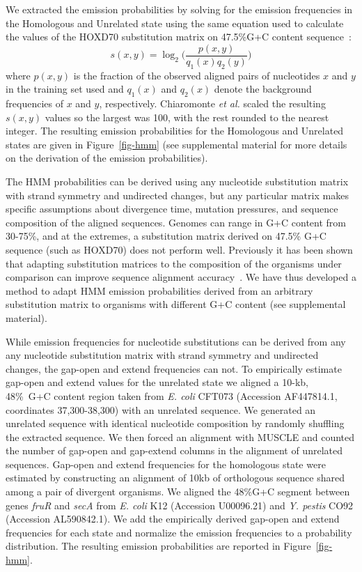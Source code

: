 \documentclass[12pt,journal,draftcls,letterpaper,onecolumn]{IEEEtran}
\begin{document}
\normalsize
We extracted the emission probabilities by solving for the emission frequencies in the
Homologous and Unrelated state using the same equation used to
calculate the values of the HOXD70 substitution matrix on 47.5\%G+C
content sequence~\cite{hoxd}:
\begin{equation}
s(x,y)= \log_{2}{\Bigg(\frac{p(x,y)}{q_{1}(x)q_{2}(y)}\Bigg)}
\end{equation}
{w}here $p(x,y)$ is the fraction of the observed aligned pairs of
nucleotides $x$ and $y$ in the training set used and $q_{1}(x)$ and
$q_{2}(x)$ denote the background frequencies of $x$ and $y$,
respectively. Chiaromonte \textit{et al.} scaled the resulting
$s(x,y)$ values so the largest was 100,
with the rest rounded to the nearest integer. The resulting emission
probabilities for the Homologous and Unrelated states are given
in Figure~\ref{fig-hmm} (see supplemental material for
more details on the derivation of the emission probabilities). 

The HMM probabilities can be derived using any nucleotide substitution matrix with  strand symmetry and undirected changes,
but any particular matrix makes specific assumptions about divergence time, mutation pressures,
and sequence composition of the aligned sequences.
Genomes can range in G+C content from 30-75\%, and at the extremes,
a substitution matrix derived on 47.5\% G+C sequence (such as HOXD70) does not
perform well. Previously it has been shown that adapting substitution matrices to the composition
of the organisms under comparison can improve sequence alignment accuracy~\cite{ref-rev3b}.  We have thus developed a method to adapt HMM emission
probabilities derived from an arbitrary substitution matrix
to organisms with different G+C content (see supplemental material).

While emission frequencies for nucleotide substitutions can be derived from
any any nucleotide substitution matrix with  strand symmetry and undirected changes, the gap-open
and extend frequencies can not.  To empirically estimate gap-open and extend values
for the unrelated state we aligned a 10-kb, 48\%~G+C content region
taken from \emph{E. coli} CFT073 (Accession AF447814.1, coordinates
37,300-38,300) with an unrelated sequence.  We generated an unrelated
sequence with identical nucleotide composition by randomly shuffling the
extracted sequence.  We then forced an
alignment with MUSCLE and counted the number of gap-open and gap-extend
columns in the alignment of unrelated sequences.  Gap-open and
extend frequencies for the homologous state were estimated by
constructing an alignment of 10kb of orthologous sequence shared among
a pair of divergent organisms.  We aligned the 48\%G+C segment between
genes \textit{fruR} and \textit{secA} from \textit{E. coli} K12
(Accession U00096.21) and \emph{Y. pestis} CO92 (Accession
AL590842.1). We add the empirically derived gap-open and extend
frequencies for each state and normalize the emission frequencies to a
probability distribution.  The resulting emission probabilities are
reported in Figure~\ref{fig-hmm}.
\end{document}
